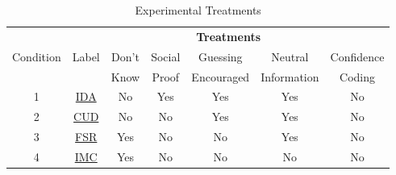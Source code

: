 \begin{table}[H]
\centering
\caption{Experimental Treatments}
\label{tab:conditions}
\begin{tabular}{ccccccc}
\hline
           & \multicolumn{6}{c}{\textbf{Treatments}}              \\
 Condition & Label & Don't & Social & Guessing   & Neutral     & Confidence \\
           &       & Know  & Proof  & Encouraged & Information & Coding  \\ \hline
 1        & \hyperref[txt:IDA]{IDA} & No    & Yes    & Yes        &  Yes        & No         \\
 2        & \hyperref[txt:CUD]{CUD} & No    & No     & Yes        &  Yes        & No         \\
 3        & \hyperref[txt:FSR]{FSR} & Yes   & No     & No         &  Yes        & No         \\
 4        & \hyperref[txt:IMC]{IMC}& Yes   & No     & No         &  No         & No         \\
  \hline
\end{tabular}
\end{table}
{}